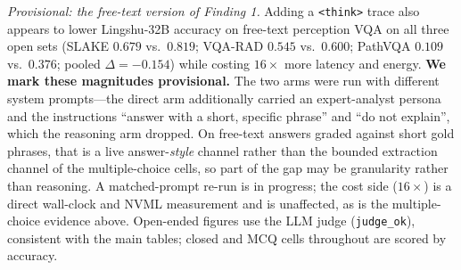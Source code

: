 \documentclass[conference]{IEEEtran}
\begin{document}
\emph{Provisional: the free-text version of Finding 1.} Adding a \texttt{<think>} trace also appears to lower Lingshu-32B accuracy on free-text perception VQA on all three open sets (SLAKE $0.679$ vs.\ $0.819$; VQA-RAD $0.545$ vs.\ $0.600$; PathVQA $0.109$ vs.\ $0.376$; pooled $\Delta{=}-0.154$) while costing $16{\times}$ more latency and energy. \textbf{We mark these magnitudes provisional.} The two arms were run with different system prompts---the direct arm additionally carried an expert-analyst persona and the instructions ``answer with a short, specific phrase'' and ``do not explain'', which the reasoning arm dropped. On free-text answers graded against short gold phrases, that is a live answer-\emph{style} channel rather than the bounded extraction channel of the multiple-choice cells, so part of the gap may be granularity rather than reasoning. A matched-prompt re-run is in progress; the cost side ($16{\times}$) is a direct wall-clock and NVML measurement and is unaffected, as is the multiple-choice evidence above. Open-ended figures use the LLM judge (\texttt{judge\_ok}), consistent with the main tables; closed and MCQ cells throughout are scored by accuracy.
\end{document}
